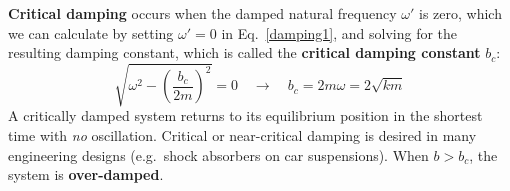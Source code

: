 \textbf{Critical damping} occurs when the damped natural frequency $\omega'$ is
zero, which we can calculate by setting $\omega'=0$ in Eq.~\ref{damping1}, and
solving for the resulting damping constant, which is called the \textbf{critical
  damping constant} $b_c$:
\begin{equation}
  \sqrt{\omega^2-\left(\frac{b_c}{2m}\right)^2}=0
  \quad\longrightarrow\quad
  \boxed{
    b_c=2m\omega=2\sqrt{km}
  }
\end{equation}
A critically damped system returns to its equilibrium position in the shortest
time with \emph{no} oscillation. Critical or near-critical damping is desired
in many engineering designs (e.g.\ shock absorbers on car suspensions). When
$b>b_c$, the system is \textbf{over-damped}.





